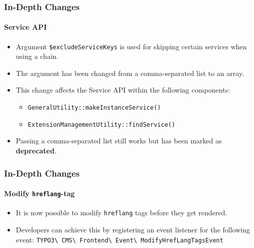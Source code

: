 
\begin{frame}[fragile]
	\frametitle{In-Depth Changes}
	\framesubtitle{Service API}

	\begin{itemize}
		\item Argument \texttt{\$excludeServiceKeys} is used for skipping certain services when using a chain.
		\item The argument has been changed from a comma-separated list to an array.
		\item This change affects the Service API within the following components:

			\begin{itemize}
				\item \texttt{GeneralUtility::makeInstanceService()}
				\item \texttt{ExtensionManagementUtility::findService()}
			\end{itemize}

		\item Passing a comma-separated list still works but has been marked as \textbf{deprecated}.

	\end{itemize}

\end{frame}


\begin{frame}[fragile]
	\frametitle{In-Depth Changes}
	\framesubtitle{Modify \texttt{hreflang}-tag}

	\lstset{basicstyle=\smaller\ttfamily}

	\begin{itemize}
		\item It is now possible to modify \texttt{hreflang} tags before they get rendered.
		\item Developers can achieve this by registering an event listener for the following event:\newline
			\smaller
				\texttt{TYPO3\textbackslash
					CMS\textbackslash
					Frontend\textbackslash
					Event\textbackslash
					ModifyHrefLangTagsEvent}
			\normalsize
	\end{itemize}

\end{frame}


